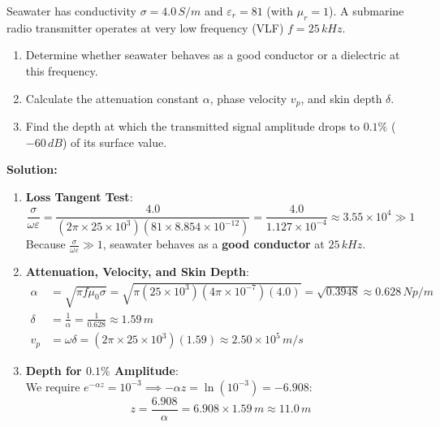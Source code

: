 \begin{example}
Seawater has conductivity $\sigma = 4.0\,\si{S/m}$ and $\varepsilon_r = 81$ (with $\mu_r = 1$). A submarine radio transmitter operates at very low frequency (VLF) $f = 25\,\si{kHz}$.
\begin{enumerate}
    \item Determine whether seawater behaves as a good conductor or a dielectric at this frequency.
    \item Calculate the attenuation constant $\alpha$, phase velocity $v_p$, and skin depth $\delta$.
    \item Find the depth at which the transmitted signal amplitude drops to $0.1\%$ ($-60\,\si{dB}$) of its surface value.
\end{enumerate}

\textbf{Solution:}
\begin{enumerate}
    \item \textbf{Loss Tangent Test}:
    \begin{equation*}
        \frac{\sigma}{\omega \varepsilon} = \frac{4.0}{(2\pi \times 25 \times 10^3)(81 \times 8.854 \times 10^{-12})} = \frac{4.0}{1.127 \times 10^{-4}} \approx 3.55 \times 10^4 \gg 1
    \end{equation*}
    Because $\frac{\sigma}{\omega\varepsilon} \gg 1$, seawater behaves as a \textbf{good conductor} at $25\,\si{kHz}$.
    
    \item \textbf{Attenuation, Velocity, and Skin Depth}:
    \begin{align*}
        \alpha &= \sqrt{\pi f \mu_0 \sigma} = \sqrt{\pi (25 \times 10^3)(4\pi \times 10^{-7})(4.0)} = \sqrt{0.3948} \approx 0.628\,\si{Np/m} \\
        \delta &= \frac{1}{\alpha} = \frac{1}{0.628} \approx 1.59\,\si{m} \\
        v_p &= \omega \delta = (2\pi \times 25 \times 10^3)(1.59) \approx 2.50 \times 10^5\,\si{m/s}
    \end{align*}
    
    \item \textbf{Depth for $0.1\%$ Amplitude}:\\
    We require $e^{-\alpha z} = 10^{-3} \implies -\alpha z = \ln(10^{-3}) = -6.908$:
    \begin{equation*}
        z = \frac{6.908}{\alpha} = 6.908 \times 1.59\,\si{m} \approx 11.0\,\si{m}
    \end{equation*}
\end{enumerate}
\end{example}

